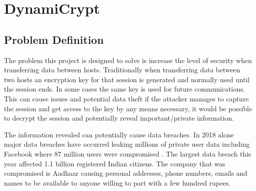 \chapter{DynamiCrypt}
\label{chap:problem}


\section{Problem Definition}

The problem this project is designed to solve is increase the level of security when transferring data between hosts. Traditionally when transferring data between two hosts an encryption key for that session is generated and normally used until the session ends. In some cases the same key is used for future communications. This can cause issues and potential data theft if the attacker manages to capture the session and get access to the key by any means necessary, it would be possible to decrypt the session and potentially reveal important/private information.

The information revealed can potentially cause data breaches. In 2018 alone major data breaches have occurred leaking millions of private user data including Facebook where 87 million users were compromised \cite{Data_breach_facebook}. The largest data breach this year affected 1.1 billion registered Indian citizens. The company that was compromised is Aadhaar \cite{Data_breach_Aadhaar} causing personal addresses, phone numbers, emails and names to be available to anyone willing to part with a few hundred rupees.

